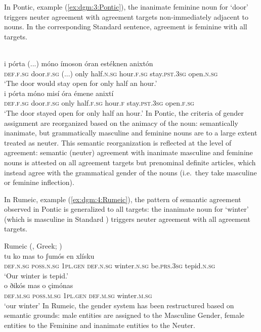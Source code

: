 \documentclass[output=collectionpaper]{langsci/langscibook}
\begin{document}
In Pontic, example (\ref{ex:dgm:3:Pontic}), the inanimate feminine noun for `door' triggers neuter agreement with agreement targets non-immediately adjacent to nouns. In the corresponding Standard  sentence, agreement is feminine with all targets.

\ea\label{ex:dgm:3:Pontic}
\ea
{}\\
\gll i p\'orta (...) m\'ono \'imoson \'oran est\'eknen anixt\'on \\
\textsc{def.f.sg} door.\textsc{f.sg} (...) only half.\textsc{n.sg} hour.\textsc{f.sg} stay.\textsc{pst.3sg} open\textsc{.n.sg} \\
\glt `The door would stay open for only half an hour.'
\ex
{}\\
\gll i p\'orta m\'ono mis\'i \'ora \'emene anixt\'i \\
\textsc{def.f.sg} door.\textsc{f.sg} only half\textsc{.f.sg} hour\textsc{.f} stay.\textsc{pst.3sg} open.\textsc{f.sg}\\
\glt `The door stayed open for only half an hour.'
\z
\z
In Pontic, the criteria of gender assignment are reorganized based on the animacy of the noun: semantically inanimate, but grammatically masculine and feminine nouns are to a large extent treated as neuter. This semantic reorganization is reflected at the level of agreement: semantic (neuter) agreement with inanimate masculine and feminine nouns is attested on all agreement targets but prenominal definite articles, which instead agree with the grammatical gender of the nouns (i.e.\ they take masculine or feminine inflection).

\largerpage
In Rumeic, example (\ref{ex:dgm:4:Rumeic}), the pattern of semantic agreement observed in Pontic is generalized to all targets: the inanimate noun for `winter' (which is masculine in Standard ) triggers neuter agreement with all agreement targets.

\ea\label{ex:dgm:4:Rumeic}
\ea
Rumeic (, Greek; \citealt[79]{Karatsareas2014})\\
\gll tu ko mas to ʃum\'os en xl\'isku\\
\textsc{def.n.sg} \textsc{poss.n.sg} \textsc{1pl.gen} \textsc{def.n.sg} winter.\textsc{n.sg} be.\textsc{prs.3sg} tepid.\textsc{n.sg}\\
\glt `Our winter is tepid.'
\ex
{}\\
\gll o ðik\'os mas o \c{c}im\'onas \\
\textsc{def.m.sg} \textsc{poss.m.sg} \textsc{1pl.gen} \textsc{def.m.sg} winter.\textsc{m.sg} \\
\glt `our winter'
\z
\z
In Rumeic, the gender system has been restructured based on semantic grounds: male entities are assigned to the Masculine Gender, female entities to the Feminine and inanimate entities to the Neuter.
\end{document}
